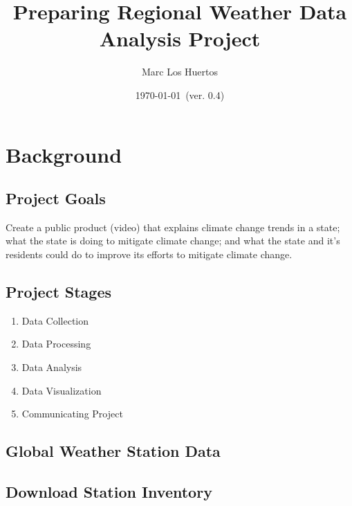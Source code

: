 \documentclass{article}\usepackage[]{graphicx}\usepackage[]{xcolor}
\title{Preparing Regional Weather Data Analysis Project}
\author{Marc Los Huertos}
\date{\today~(ver. 0.4)} %
\begin{document}
\maketitle


\section{Background}

\subsection{Project Goals}

Create a public product (video) that explains climate change trends in a state; what the state is doing to mitigate climate change; and what the state and it's residents could do to improve its efforts to mitigate climate change.

\subsection{Project Stages}

\begin{enumerate}
  \item Data Collection
  \item Data Processing
  \item Data Analysis
  \item Data Visualization
  \item Communicating Project
\end{enumerate}


\subsection{Global Weather Station Data}

\subsection{Download Station Inventory}
\end{document}
